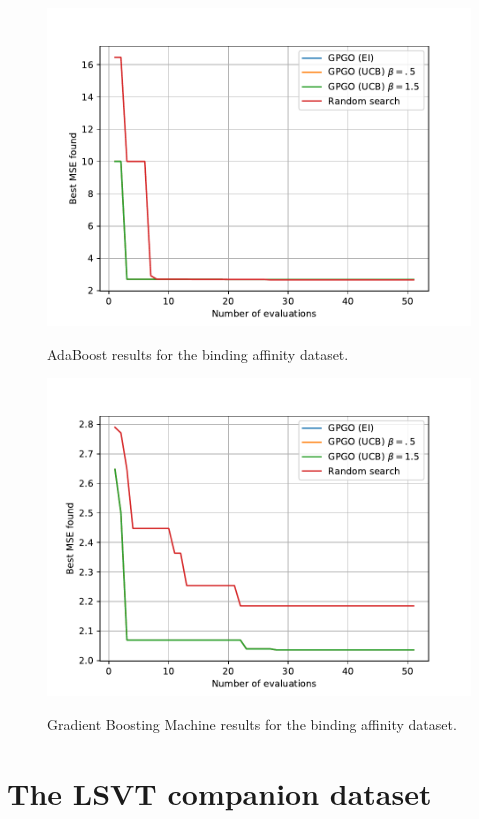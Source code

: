 \documentclass[10pt,a4paper,twoside]{book}
\begin{document}
\begin{figure}
\centering
\caption{AdaBoost results for the binding affinity dataset.}
\includegraphics[scale=0.75]{figures/chapter4/aff/ada}
\label{fig:affada}
\end{figure}

\begin{figure}
\centering
\caption{Gradient Boosting Machine results for the binding affinity dataset.}
\includegraphics[scale=0.75]{figures/chapter4/aff/gbm}
\label{fig:affgbm}
\end{figure}

\newpage

\section{The LSVT companion dataset}
\end{document}

